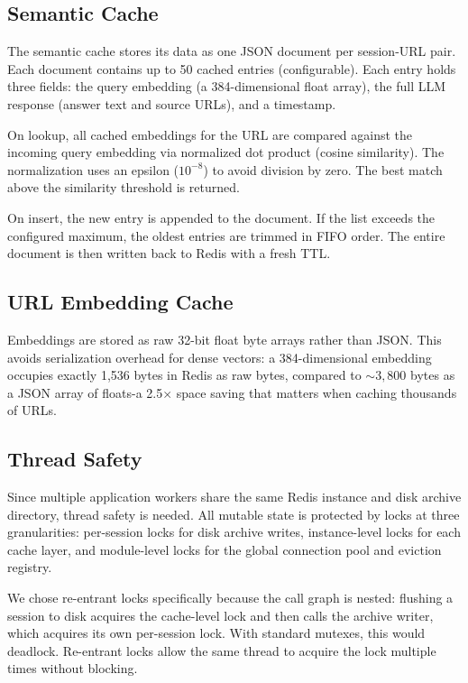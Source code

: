 \documentclass[conference]{IEEEtran}
\begin{document}
\subsection{Semantic Cache}

The semantic cache stores its data as one JSON document per session-URL pair. Each document contains up to 50 cached entries (configurable). Each entry holds three fields: the query embedding (a 384-dimensional float array), the full LLM response (answer text and source URLs), and a timestamp.

On lookup, all cached embeddings for the URL are compared against the incoming query embedding via normalized dot product (cosine similarity). The normalization uses an epsilon ($10^{-8}$) to avoid division by zero. The best match above the similarity threshold is returned.

On insert, the new entry is appended to the document. If the list exceeds the configured maximum, the oldest entries are trimmed in FIFO order. The entire document is then written back to Redis with a fresh TTL.

\subsection{URL Embedding Cache}

Embeddings are stored as raw 32-bit float byte arrays rather than JSON. This avoids serialization overhead for dense vectors: a 384-dimensional embedding occupies exactly 1{,}536 bytes in Redis as raw bytes, compared to ${\sim}3{,}800$ bytes as a JSON array of floats-a 2.5$\times$ space saving that matters when caching thousands of URLs.

\subsection{Thread Safety}

Since multiple application workers share the same Redis instance and disk archive directory, thread safety is needed. All mutable state is protected by locks at three granularities: per-session locks for disk archive writes, instance-level locks for each cache layer, and module-level locks for the global connection pool and eviction registry.

We chose re-entrant locks specifically because the call graph is nested: flushing a session to disk acquires the cache-level lock and then calls the archive writer, which acquires its own per-session lock. With standard mutexes, this would deadlock. Re-entrant locks allow the same thread to acquire the lock multiple times without blocking.
\end{document}
